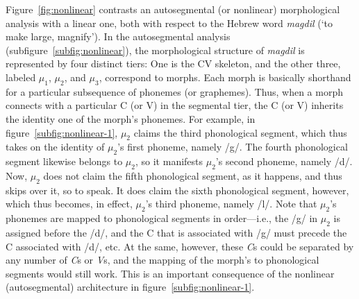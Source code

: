  Figure~\ref{fig:nonlinear} contrasts an autosegmental (or nonlinear) morphological analysis  with a linear one, both with respect to the Hebrew word \textit{magdil} (`to make large, magnify').
In the autosegmental analysis (subfigure~\ref{subfig:nonlinear}), the morphological structure of \textit{magdil} is represented by four distinct tiers: One is the CV
skeleton, and the other three, labeled $\mu_1$, $\mu_2$, and $\mu_3$, 
correspond to morphs. Each morph is basically shorthand for a particular 
subsequence of phonemes (or graphemes). Thus, when a morph connects 
with a particular C (or V) in the segmental tier, the C (or V) inherits the 
identity one of the morph's phonemes. For example,  in 
figure~\ref{subfig:nonlinear-1}, $\mu_2$ claims the third phonological 
segment, which thus takes on the identity of  $\mu_2$'s first phoneme, 
namely /g/. The fourth phonological segment likewise belongs to $\mu_2$, 
so it manifests $\mu_2$'s second phoneme, namely /d/. Now, $\mu_2$ 
does not claim the fifth phonological segment, as it happens, and thus skips 
over it, so to speak. It does claim the sixth phonological segment, however, 
which thus becomes, in effect, $\mu_2$'s third phoneme, namely /l/. 
Note that $\mu_2$'s phonemes are mapped to phonological segments in 
order---i.e., the /g/ in $\mu_2$ is assigned before the /d/, and the C that 
is associated with /g/ must precede the C associated with /d/, etc. At the 
same, however, these \textit{C}s could be separated by any number of 
\textit{C}s or \textit{V}s, and the mapping of the morph's to phonological 
segments would still work. This is an important consequence of the nonlinear 
(autosegmental) architecture in figure~\ref{subfig:nonlinear-1}. 



